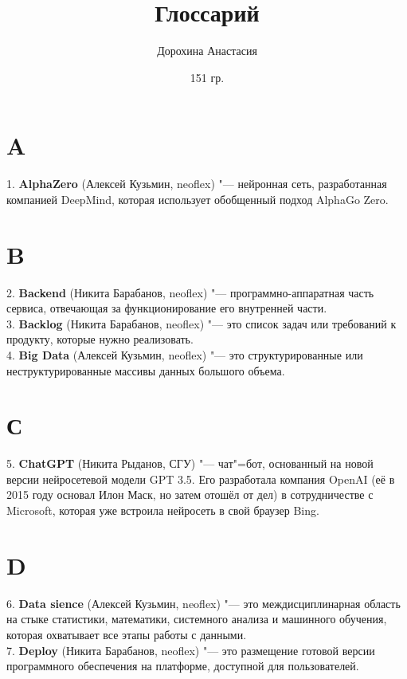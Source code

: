 \documentclass[14 pt]{extarticle}
\title{Глоссарий}
\author{Дорохина Анастасия}
\date{151 гр.}
\begin{document}
\maketitle

\section*{A}
    1. \textbf{AlphaZero} (Алексей Кузьмин, neoflex) "--- нейронная сеть, разработанная компанией DeepMind, которая использует обобщенный подход AlphaGo Zero.
\section*{B}
    2. \textbf{Backend} (Никита Барабанов, neoflex) "--- программно-аппаратная часть сервиса, отвечающая за функционирование его внутренней части.\\

    3. \textbf{Backlog} (Никита Барабанов, neoflex) "--- это список задач или требований к продукту, которые нужно реализовать.\\
    
    4. \textbf{Big Data} (Алексей Кузьмин, neoflex) "--- это структурированные или неструктурированные массивы данных большого объема.
    
\section*{С}
    5. \textbf{ChatGPT} (Никита Рыданов, СГУ) "--- чат"=бот, основанный на новой версии нейросетевой модели GPT 3.5. Его разработала компания OpenAI (её в 2015 году основал Илон Маск, но затем отошёл от дел) в сотрудничестве с Microsoft, которая уже встроила нейросеть в свой браузер Bing. \\
    
\section*{D}
    6. \textbf{Data sience} (Алексей Кузьмин, neoflex) "--- это междисциплинарная область на стыке статистики, математики, системного анализа и машинного обучения, которая охватывает все этапы работы с данными. \\
    
    7. \textbf{Deploy} (Никита Барабанов, neoflex) "--- это размещение готовой версии программного обеспечения на платформе, доступной для пользователей. \\
\end{document}

